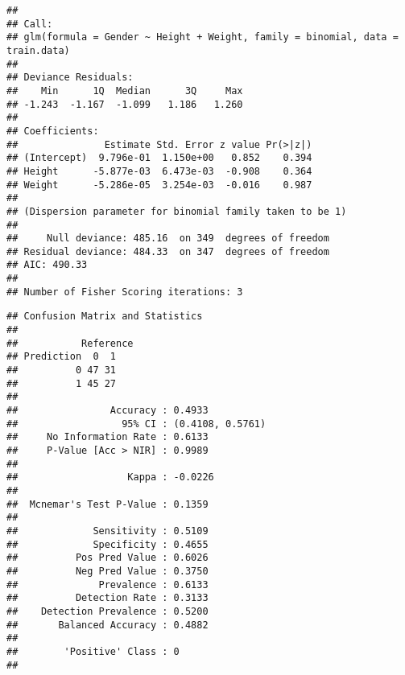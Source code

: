 \documentclass[
]{article}
\newenvironment{Shaded}{\begin{snugshade}}{\end{snugshade}}
\newcommand{\DataTypeTok}[1]{\textcolor[rgb]{0.13,0.29,0.53}{#1}}
\newcommand{\DecValTok}[1]{\textcolor[rgb]{0.00,0.00,0.81}{#1}}
\newcommand{\FloatTok}[1]{\textcolor[rgb]{0.00,0.00,0.81}{#1}}
\newcommand{\KeywordTok}[1]{\textcolor[rgb]{0.13,0.29,0.53}{\textbf{#1}}}
\newcommand{\NormalTok}[1]{#1}
\newcommand{\OperatorTok}[1]{\textcolor[rgb]{0.81,0.36,0.00}{\textbf{#1}}}
\newcommand{\StringTok}[1]{\textcolor[rgb]{0.31,0.60,0.02}{#1}}
\begin{document}
\begin{verbatim}
## 
## Call:
## glm(formula = Gender ~ Height + Weight, family = binomial, data = train.data)
## 
## Deviance Residuals: 
##    Min      1Q  Median      3Q     Max  
## -1.243  -1.167  -1.099   1.186   1.260  
## 
## Coefficients:
##               Estimate Std. Error z value Pr(>|z|)
## (Intercept)  9.796e-01  1.150e+00   0.852    0.394
## Height      -5.877e-03  6.473e-03  -0.908    0.364
## Weight      -5.286e-05  3.254e-03  -0.016    0.987
## 
## (Dispersion parameter for binomial family taken to be 1)
## 
##     Null deviance: 485.16  on 349  degrees of freedom
## Residual deviance: 484.33  on 347  degrees of freedom
## AIC: 490.33
## 
## Number of Fisher Scoring iterations: 3
\end{verbatim}

\begin{Shaded}
\end{Shaded}

\begin{verbatim}
## Confusion Matrix and Statistics
## 
##           Reference
## Prediction  0  1
##          0 47 31
##          1 45 27
##                                           
##                Accuracy : 0.4933          
##                  95% CI : (0.4108, 0.5761)
##     No Information Rate : 0.6133          
##     P-Value [Acc > NIR] : 0.9989          
##                                           
##                   Kappa : -0.0226         
##                                           
##  Mcnemar's Test P-Value : 0.1359          
##                                           
##             Sensitivity : 0.5109          
##             Specificity : 0.4655          
##          Pos Pred Value : 0.6026          
##          Neg Pred Value : 0.3750          
##              Prevalence : 0.6133          
##          Detection Rate : 0.3133          
##    Detection Prevalence : 0.5200          
##       Balanced Accuracy : 0.4882          
##                                           
##        'Positive' Class : 0               
## 
\end{verbatim}
\end{document}
